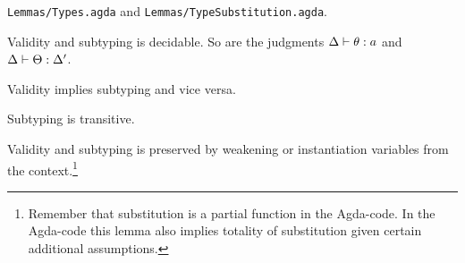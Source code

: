 \texttt{Lemmas/Types.agda} and \texttt{Lemmas/TypeSubstitution.agda}.

\begin{lemma}
  \label{lemma:typdec}
  Validity and subtyping is decidable. So are the judgments
  ${\Delta} |- {\theta} : {a}$ and
  ${\Delta} |- {\Theta} : {\Delta'}$.
\end{lemma}

\begin{lemma}
  \label{lemma:typeq}
  Validity implies subtyping and vice versa.
\end{lemma}

\begin{lemma}
  \label{lemma:transitive}
  Subtyping is transitive.
\end{lemma}

\begin{lemma}
  \label{lemma:typ-context}
  Validity and subtyping is preserved by weakening or instantiation variables
  from the context.\footnote{Remember that substitution is a partial function in
    the Agda-code. In the Agda-code this lemma also implies totality of
    substitution given certain additional assumptions.}
\end{lemma}

